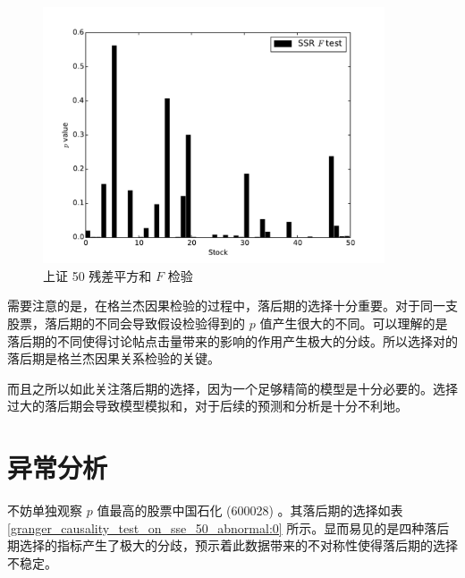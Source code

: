 \begin{figure}
  \centering
  \includegraphics[width=0.9\textwidth]{plots/granger_causality_test_on_sse_50_ssr_ftest.pdf}
  \caption{上证 50 残差平方和 $F$ 检验}
  \label{f_test:15}
\end{figure}

需要注意的是，在格兰杰因果检验的过程中，落后期的选择十分重要。对于同一支股票，落后期的不同会导致假设检验得到的 $p$ 值产生很大的不同。可以理解的是落后期的不同使得讨论帖点击量带来的影响的作用产生极大的分歧。所以选择对的落后期是格兰杰因果关系检验的关键。

而且之所以如此关注落后期的选择，因为一个足够精简的模型是十分必要的。选择过大的落后期会导致模型模拟和，对于后续的预测和分析是十分不利地。

\section{异常分析}

不妨单独观察 $p$ 值最高的股票中国石化 (600028) 。其落后期的选择如表 \ref{granger_causality_test_on_sse_50_abnormal:0} 所示。显而易见的是四种落后期选择的指标产生了极大的分歧，预示着此数据带来的不对称性使得落后期的选择不稳定。

